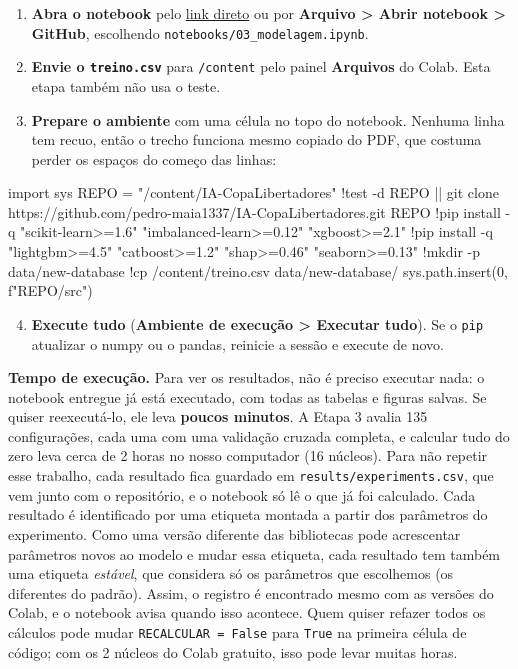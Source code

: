 \documentclass[11pt,a4paper]{article}
\begin{document}
\begin{enumerate}
\item \textbf{Abra o notebook} pelo \href{https://colab.research.google.com/github/pedro-maia1337/IA-CopaLibertadores/blob/main/notebooks/03_modelagem.ipynb}{link direto} ou por \textbf{Arquivo > Abrir notebook > GitHub}, escolhendo \texttt{notebooks/03\_modelagem.ipynb}.
\item \textbf{Envie o \texttt{treino.csv}} para \texttt{/content} pelo painel \textbf{Arquivos} do Colab. Esta etapa também não usa o teste.
\item \textbf{Prepare o ambiente} com uma célula no topo do notebook. Nenhuma linha tem recuo, então o trecho funciona mesmo copiado do PDF, que costuma perder os espaços do começo das linhas:
\end{enumerate}

\begin{codigo}
import sys
REPO = "/content/IA-CopaLibertadores"
!test -d {REPO} || git clone https://github.com/pedro-maia1337/IA-CopaLibertadores.git {REPO}
!pip install -q "scikit-learn>=1.6" "imbalanced-learn>=0.12" "xgboost>=2.1"
!pip install -q "lightgbm>=4.5" "catboost>=1.2" "shap>=0.46" "seaborn>=0.13"
!mkdir -p data/new-database
!cp /content/treino.csv data/new-database/
sys.path.insert(0, f"{REPO}/src")
\end{codigo}

\begin{enumerate}\setcounter{enumi}{3}
\item \textbf{Execute tudo} (\textbf{Ambiente de execução > Executar tudo}). Se o \texttt{pip} atualizar o numpy ou o pandas, reinicie a sessão e execute de novo.
\end{enumerate}

\textbf{Tempo de execução.} Para ver os resultados, não é preciso executar nada: o notebook entregue já está executado, com todas as tabelas e figuras salvas. Se quiser reexecutá-lo, ele leva \textbf{poucos minutos}. A Etapa 3 avalia 135 configurações, cada uma com uma validação cruzada completa, e calcular tudo do zero leva cerca de 2 horas no nosso computador (16 núcleos). Para não repetir esse trabalho, cada resultado fica guardado em \texttt{results/experiments.csv}, que vem junto com o repositório, e o notebook só lê o que já foi calculado. Cada resultado é identificado por uma etiqueta montada a partir dos parâmetros do experimento. Como uma versão diferente das bibliotecas pode acrescentar parâmetros novos ao modelo e mudar essa etiqueta, cada resultado tem também uma etiqueta \emph{estável}, que considera só os parâmetros que escolhemos (os diferentes do padrão). Assim, o registro é encontrado mesmo com as versões do Colab, e o notebook avisa quando isso acontece. Quem quiser refazer todos os cálculos pode mudar \texttt{RECALCULAR = False} para \texttt{True} na primeira célula de código; com os 2 núcleos do Colab gratuito, isso pode levar muitas horas.
\end{document}
